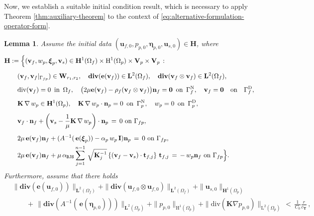 \documentclass[11pt]{article}
\numberwithin{equation}{section}
\newcommand{\ds}{\displaystyle}
\newcommand{\bbeta}{{\boldsymbol\eta}}
\newcommand{\bxi}{{\boldsymbol\xi}}
\newcommand{\bv}{{\mathbf{v}}}
\newcommand{\bu}{\mathbf{u}}
\newcommand{\bt}{{\mathbf{t}}}
\newcommand{\bn}{{\mathbf{n}}}
\newcommand{\be}{{\mathbf{e}}}
\newcommand{\0}{{\mathbf{0}}}
\def\bK{\mathbf{K}}
\def\bI{\mathbf{I}}
\def\bV{\mathbf{V}}
\def\bW{\mathbf{W}}
\def\bT{\mathbf{T}}
\newcommand{\bL}{\mathbf{L}}
\newcommand\bH{\mathbf{H}}
\def\H{\mathrm{H}}
\def\L{\mathrm{L}}
\def\rD{\mathrm{D}}
\def\rN{\mathrm{N}}
\def\BJS{\mathtt{BJS}}
\def\bdiv{\mathbf{div}}
\def\div{\mathrm{div}}
\def\qon{{\quad\hbox{on}\quad}}
\newtheorem{lem}[thm]{Lemma}
\numberwithin{equation}{section}
\begin{document}
Now, we establish a suitable initial condition result, which is necessary to apply Theorem \ref{thm:auxiliary-theorem} to the
context of \eqref{eq:alternative-formulation-operator-form}.
%
\begin{lem}\label{lem:sol0-in-M-operator}
Assume the initial data $(\bu_{f,0},p_{p,0},\bbeta_{p,0},\bu_{s,0}) \in \bH$, where
%
\begin{subequations}\label{eq:H-space-initial-condition}
\begin{align}
  & \ds \bH := \Big\{ (\bv_f,w_p,\bxi_p,\bv_s)\in \bH^1(\Omega_f) \times \H^1(\Omega_p) \times \bV_p\times \bV_p  \,:
  \nonumber \\[1ex] 
& \ds \qquad (\bv_f,\bv_f|_{\Gamma_{fp}}) \in \bW_{r_1,r_2},\quad 
\bdiv(\be(\bv_f)) \in \bL^2(\Omega_f),\quad 
\bdiv(\bv_f\otimes \bv_f)\in \bL^2(\Omega_f), \nonumber \\[1ex]
& \ds \qquad \div(\bv_f) = 0\,\mbox{ in }\, \Omega_f, \quad \big( 2\mu\be(\bv_f) - \rho_f(\bv_f\otimes\bv_f) \big)\bn_f = \0 \,\mbox{ on }\, \Gamma^{\rN}_f,\quad 
\bv_f = \0 \qon \Gamma^{\rD}_f, \label{bdycond-1}\\[1ex]
& \ds\qquad \bK\,\nabla\,w_p\in \bH^1(\Omega_p),\quad \bK\,\nabla\,w_p\cdot\bn_p = 0 \,\mbox{ on }\, \Gamma^{\rN}_p,\quad w_p = 0 \,\mbox{ on }\, \Gamma^{\rD}_p, \label{bdycond-2}\\[1ex]
& \ds \qquad  \ds \bv_f\cdot\bn_f + \left(\bv_s -\frac{1}{\mu}  \bK\,\nabla\,w_p\right)\cdot\bn_p \,=\, 0 \mbox{ on } \Gamma_{fp}, \label{bdycond-3} \\[1ex]
& \ds\qquad  2\mu\,\be(\bv_f)\bn_f + (A^{-1}(\, \be(\bxi_{p})) - \alpha_p\,w_{p}\,\bI)\bn_p \,=\, 0 \mbox{ on } \Gamma_{fp},\label{bdycond-4}\\
& \ds \qquad  2\mu\,\be(\bv_f)\bn_f+ \mu\,\alpha_{\BJS}\sum^{n-1}_{j=1}\,\sqrt{\bK^{-1}_j}\left\{\left(\bv_f - \bv_s\right)\cdot\bt_{f,j}\right\}\,\bt_{f,j} \,=\, -\,w_p\bn_f \mbox{ on } \Gamma_{fp} \label{bdycond-5}\Big\}.
\end{align}
\end{subequations}
Furthermore, assume that there holds
\begin{align}
&\|\bdiv( \be(\bu_{f,0}))\|_{\bL^{2}(\Omega_f)} 
+ \|\bdiv(\bu_{f,0}\otimes \bu_{f,0})\|_{\bL^{2}(\Omega_f)}
+ \|\bu_{s,0}\|_{\bH^1(\Omega_p)}  \nonumber \\
&\qquad +\, \|\bdiv(A^{-1}(\, \be(\bbeta_{p,0})))\|_{\bL^2(\Omega_p)}
+ \|p_{p,0}\|_{\H^1(\Omega_p)} 
+ \|\div(\bK\nabla p_{p,0})\|_{\L^2(\Omega_p)} 
\,<\, \frac{1}{C_0}\frac{r}{c_\bT} \,, \label{eq:extra-assumption}

\end{align}
\end{lem}
\end{document}
